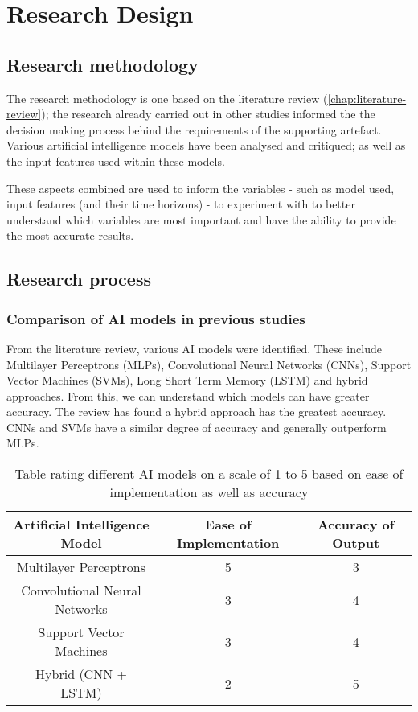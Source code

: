 \chapter{Research Design} \label{chap:research-design}
\section{Research methodology}
The research methodology is one based on the literature review (\autoref{chap:literature-review});
the research already carried out in other studies
informed the the decision making process behind the requirements of the supporting artefact. Various artificial
intelligence models have been analysed and critiqued; as well as the input features used within these models.

These aspects combined are used to inform the variables - such as model used, input features
(and their time horizons) - to experiment with to better understand which variables are most important
and have the ability to provide the most accurate results.


\section{Research process}
\subsection{Comparison of AI models in previous studies}
From the literature review, various AI models were identified. These include Multilayer Perceptrons (MLPs),
Convolutional Neural Networks (CNNs), Support Vector Machines (SVMs), Long Short Term Memory (LSTM) and hybrid
approaches. From this, we can understand which models can have greater accuracy. The review has found a hybrid
approach has the greatest accuracy. CNNs and SVMs have a similar degree of accuracy and generally outperform MLPs.

\begin{table}[h]
    \centering
    \begin{tabular}{|c|c|c|}
        \hline
        Artificial Intelligence Model & Ease of Implementation & Accuracy of Output \\
        \hline\hline
        Multilayer Perceptrons & 5 & 3 \\
        Convolutional Neural Networks & 3 & 4 \\
        Support Vector Machines & 3 & 4 \\
        Hybrid (CNN + LSTM) & 2 & 5 \\
        \hline
    \end{tabular}
    \caption[Table rating different AI models]{Table rating different AI models on a scale of 1 to 5 based on ease of implementation as well as accuracy}
    \label{tab:research_model_comparison}
\end{table}
\FloatBarrier

